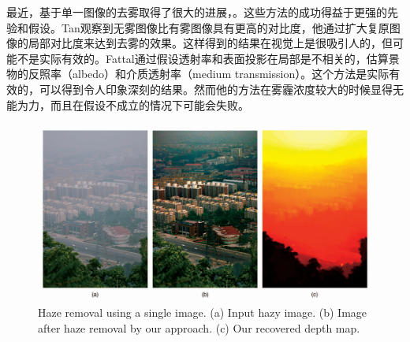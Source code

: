 \documentclass{ctexart}
\begin{document}
最近，基于单一图像的去雾取得了很大的进展\cite{Fattal2008}，\cite{Tan2008}。这些方法的成功得益于更强的先验和假设。Tan\cite{Tan2008}观察到无雾图像比有雾图像具有更高的对比度，他通过扩大复原图像的局部对比度来达到去雾的效果。这样得到的结果在视觉上是很吸引人的，但可能不是实际有效的。Fattal\cite{Fattal2008}通过假设透射率和表面投影在局部是不相关的，估算景物的反照率（albedo）和介质透射率（medium transmission）。这个方法是实际有效的，可以得到令人印象深刻的结果。然而他的方法在雾霾浓度较大的时候显得无能为力，而且在假设不成立的情况下可能会失败。\par




\begin{figure}[htbp]
    \centering
    \includegraphics[width=\textwidth]{img/02.png}
    \caption{Haze removal using a single image. (a) Input hazy image. (b) Image after haze removal by our approach. (c) Our recovered depth map.}
    \label{fig:01}
\end{figure}




\end{document}
